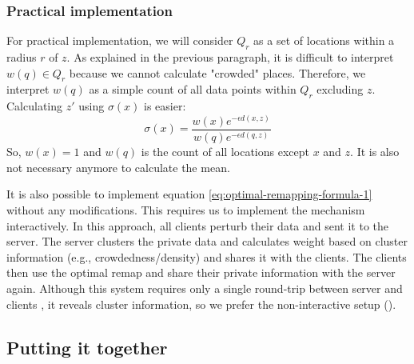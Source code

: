 \subsubsection{Practical implementation}
For practical implementation, we will consider $Q_r$ as a set of locations within a radius $r$ of $z$.
As explained in the previous paragraph, it is difficult to interpret $w(q) \in Q_r$ because we cannot calculate "crowded" places.
Therefore, we interpret $w(q)$ as a simple count of all data points within $Q_r$ excluding $z$. Calculating $z'$ using $\sigma(x)$ is easier:
\begin{equation}
  \sigma(x) = \frac{w(x)e^{-\epsilon d(x, z)}}{w(q)e^{-\epsilon d(q, z)}}
  \label{eq:optimal-remapping-formula-2}
\end{equation}
So, $w(x) = 1$ and $w(q)$ is the count of all locations except $x$ and $z$. It is also not necessary anymore to calculate the mean.

It is also possible to implement equation \ref{eq:optimal-remapping-formula-1} without any modifications.
This requires us to implement the mechanism interactively.
In this approach, all clients perturb their data and sent it to the server.
The server clusters the private data and calculates weight based on cluster information (e.g., crowdedness/density) and shares it with the clients.
The clients then use the optimal remap and share their private information with the server again.
Although this system requires only a single round-trip between server and clients , it reveals cluster information, so we prefer the non-interactive setup ().



\subsection{Putting it together}


\newpage


